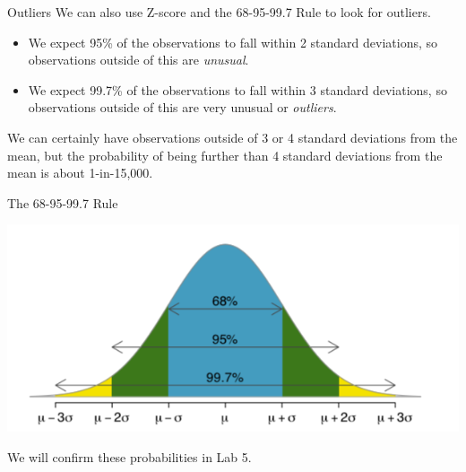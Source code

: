 \begin{frame}{Outliers}
    We can also use Z-score and the 68-95-99.7 Rule to look for outliers.
    \begin{itemize}
        \item We expect 95\% of the observations to fall within 2 standard deviations, so observations outside of this are \textit{unusual}.
        \item We expect 99.7\% of the observations to fall within 3 standard deviations, so observations outside of this are very unusual or \textit{outliers}.
    \end{itemize}
    We can certainly have observations outside of 3 or 4 standard deviations from the mean, but the probability of being further than 4 standard deviations from the mean is about 1-in-15,000.
\end{frame}

\begin{frame}{The 68-95-99.7 Rule}
    \begin{center}
        \includegraphics[scale=0.5]{images/rule68_95_997.png}
    \end{center}
    We will confirm these probabilities in Lab 5.
\end{frame}